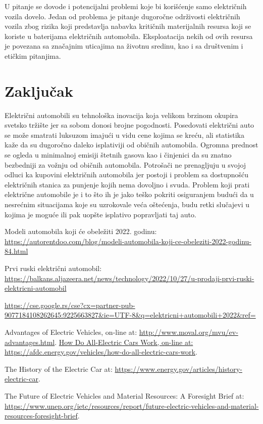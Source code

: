 \documentclass[a4paper]{article}
\begin{document}
U pitanje se dovode i potencijalni problemi koje bi korišćenje samo električnih vozila dovelo. Jedan od problema je pitanje dugoročne održivosti električnih vozila zbog rizika koji predstavlja nabavka kritičnih materijalnih resursa koji se koriste u baterijama električnih automobila. Eksploatacija nekih od ovih resursa je povezana sa značajnim uticajima na životnu sredinu, kao i sa društvenim i etičkim pitanjima.


\section{Zaključak}
\label{sec:zakljucak}

Električni automobili su tehnološka inovacija koja velikom brzinom okupira svetsko tržište jer sa sobom donosi brojne pogodnosti. Posedovati električni auto se može smatrati luksuzom imajući u vidu cene kojima se kreću, ali statistika kaže da su dugoročno daleko isplativiji od običnih automobila. Ogromna prednost se ogleda u minimalnoj emisiji štetnih gasova kao i činjenici da su znatno bezbedniji za vožnju od običnih automobila. Potrošači ne prenagljuju u svojoj odluci ka kupovini električnih automobila jer postoji i problem sa dostupnošću električnih stanica za punjenje kojih nema dovoljno i svuda. Problem koji prati električne automobile je i to što ih je jako teško pokriti osiguranjem budući da u nesrećnim situacijama koje su uzrokovale veća oštećenja, budu retki slučajevi u kojima je moguće ili pak uopšte isplativo popravljati taj auto.

\newpage
{}
\appendix

\begin{thebibliography}{9}

Modeli automobila koji će obeležiti 2022. godinu: \url{https://autorentdoo.com/blog/modeli-automobila-koji-ce-obeleziti-2022-godinu-84.html}

 Prvi ruski električni automobil: \url{https://balkans.aljazeera.net/news/technology/2022/10/27/u-prodaji-prvi-ruski-elektricni-automobil}

 \url{https://cse.google.rs/cse?cx=partner-pub-9077184108262645:9225663827&ie=UTF-8&q=elektricni+automobili+2022&ref=}

 Advantages of Electric Vehicles,  on-line at: \url{http://www.moval.org/mvu/ev-advantages.html}.
\url{How Do All-Electric Cars Work,  on-line at: https://afdc.energy.gov/vehicles/how-do-all-electric-cars-work}.

The History of the Electric Car at: \url{https://www.energy.gov/articles/history-electric-car}.

The Future of Electric Vehicles and Material Resources: A Foresight Brief at: \url{https://www.unep.org/ietc/resources/report/future-electric-vehicles-and-material-resources-foresight-brief}.

\end{thebibliography}
\end{document}
